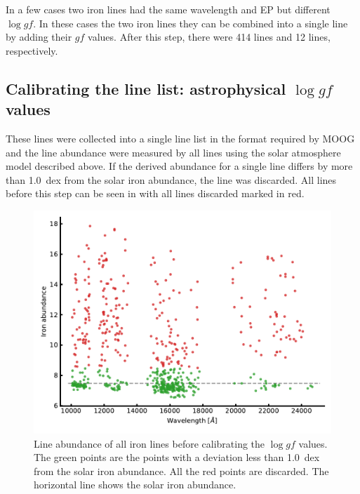 In a few cases two iron lines had the same wavelength and EP but different $\log \mathit{gf}$. In
these cases the two iron lines they can be combined into a single line by adding their $\mathit{gf}$
values. After this step, there were 414  lines and 12  lines, respectively.



\subsection{Calibrating the line list: astrophysical $\log \mathit{gf}$ values}

These lines were collected into a single line list in the format required by MOOG \citep{Sneden1973}
and the line abundance were measured by all lines using the solar atmosphere model described above.
If the derived abundance for a single line differs by more than \SI{1.0}{dex} from the solar iron
abundance, the line was discarded. All lines before this step can be seen in
 with all lines discarded marked in red.

\begin{figure}[htpb!]
    \centering
    \includegraphics[width=1.0\linewidth]{figures/calibrated_loggf.pdf}
    \caption{Line abundance of all iron lines before calibrating the $\log \mathit{gf}$ values. The
             green points are the points with a deviation less than \SI{1.0}{dex} from the solar
             iron abundance. All the red points are discarded. The horizontal line shows the solar
             iron abundance.}
    \label{fig:calibrated_loggf}
\end{figure}


